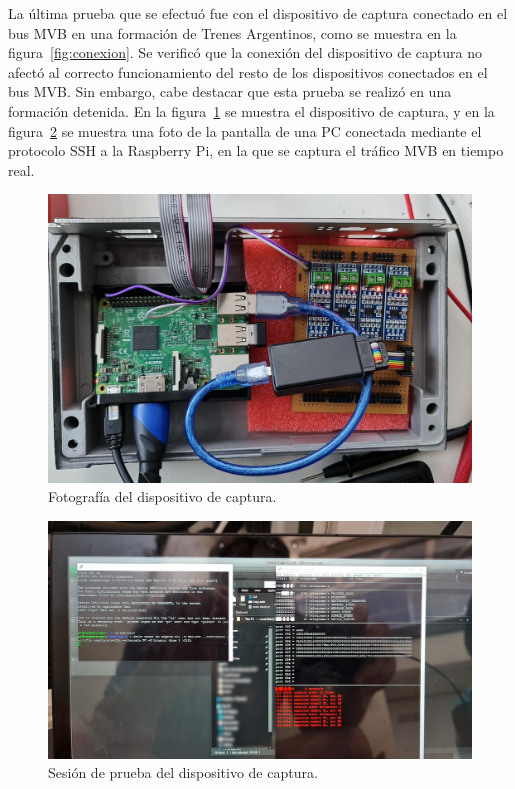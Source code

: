 La última prueba que se efectuó fue con el dispositivo de captura conectado en el bus MVB en una formación de Trenes Argentinos, como se muestra en la figura~\ref{fig:conexion}.
Se verificó que la conexión del dispositivo de captura no afectó al correcto funcionamiento del resto de los dispositivos conectados en el bus MVB. Sin embargo, cabe destacar que esta prueba se realizó en una formación detenida.
En la figura~\ref{fig:disp-captura} se muestra el dispositivo de captura, y en la figura~\ref{fig:disp-captura-ssh} se muestra una foto de la pantalla de una PC conectada mediante el protocolo SSH a la Raspberry Pi, en la que se captura el tráfico MVB en tiempo real.

\begin{figure}[htbp]
	\centering
	\includegraphics[width=\textwidth]{./Figures/disp-captura.jpg}
	\caption{Fotografía del dispositivo de captura.}
    \label{fig:disp-captura}
\end{figure}

\begin{figure}[htbp]
	\centering
	\includegraphics[width=\textwidth]{./Figures/disp-captura-ssh.jpg}
	\caption{Sesión de prueba del dispositivo de captura.}
    \label{fig:disp-captura-ssh}
\end{figure}
